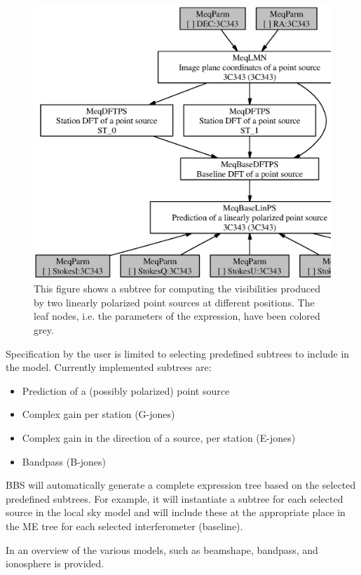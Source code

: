 \documentclass[10pt]{lofar}
\begin{document}
\begin{figure}[htbp]
\centering
\includegraphics[width=\textwidth]{images/expr_graph_sdd.ps}
\caption{This figure shows a subtree for computing the visibilities produced by
two linearly polarized point sources at different positions. The leaf nodes,
i.e. the parameters of the expression, have been colored grey.}
\label{fig:expr_tree}
\end{figure}

Specification by the user is limited to selecting predefined subtrees to include
in the model. Currently implemented subtrees are:
\begin{itemize}
\item Prediction of a (possibly polarized) point source
\item Complex gain per station (G-jones)
\item Complex gain in the direction of a source, per station (E-jones)
\item Bandpass (B-jones)
\end{itemize}

BBS will automatically generate a complete expression tree based on the
selected predefined subtrees. For example, it will instantiate a subtree for
each selected source in the local sky model and will include these at the
appropriate place in the ME tree for each selected interferometer (baseline).

In \cite[sec. 2]{LOFAR-ASTRON-SDD-050} an overview of the various models, such
as beamshape, bandpass, and ionosphere is provided. 
\end{document}
